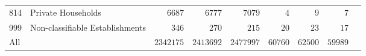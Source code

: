 \documentclass[9pt, oneside]{article}   	%
\begin{document}
\begin{longtable}{lp{3 in}ccccccc}
814  & Private Households & $\phantom{000}6687$ & $\phantom{000}6777$ & $\phantom{000}7079$ & $\phantom{0000}4$ & $\phantom{0000}9$ & $\phantom{0000}7$ \\
999  & Non-classifiable Establishments & $\phantom{0000}346$ & $\phantom{0000}270$ & $\phantom{0000}215$ & $\phantom{000}20$ & $\phantom{000}23$ & $\phantom{000}17$ \\
\cline{1-1} \cline{2-2} \cline{3-3} \cline{4-4} \cline{5-5} \cline{6-6} \cline{7-7} \cline{8-8} \cline{9-9} %
All  &  & $2342175$ & $2413692$ & $2477997$ & $60760$ & $62500$ & $59989$ \\
\hline 
\end{longtable}



\pagebreak





\end{document}
